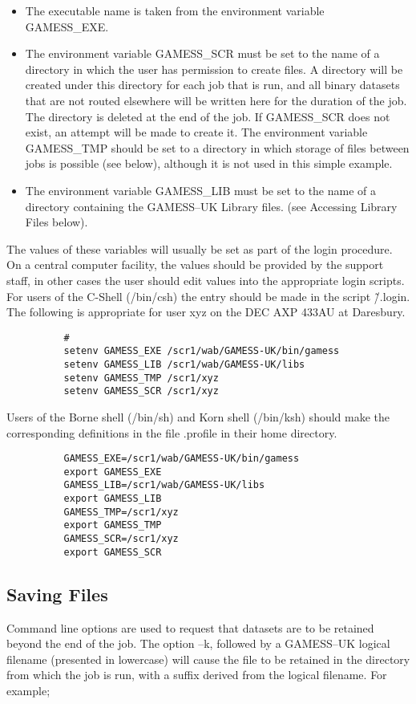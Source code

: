 \documentclass[11pt,fleqn]{article}
\begin{document}
\begin{itemize}
\item The executable name is taken from the environment variable GAMESS\_EXE.

\item The environment variable GAMESS\_SCR must be set to the name of a directory
in which the user has permission to create files. A directory will be created under
this directory for each job that is run, and all binary datasets that are not routed elsewhere
will be written here for the duration of the job. The directory is deleted at the end of 
the job. If GAMESS\_SCR does not exist, an attempt will be made to create it. The 
environment variable GAMESS\_TMP should be set 
to a directory in which storage of files between jobs is possible (see below),
although it is not used in this simple example.
\item The environment variable GAMESS\_LIB must be set to the name of a directory containing
the GAMESS--UK Library files. (see Accessing Library Files below).
\end{itemize}
The values of these variables will usually be set as part of the
login procedure. On a central computer facility, the values should be provided
by the support staff, in other cases the user should edit values into the appropriate
login scripts. For users of the C-Shell (/bin/csh) the entry should be made in the
script \~/.login. The following is appropriate for user xyz on the DEC AXP 433AU at Daresbury.

{
\footnotesize
\begin{verbatim}
          #
          setenv GAMESS_EXE /scr1/wab/GAMESS-UK/bin/gamess
          setenv GAMESS_LIB /scr1/wab/GAMESS-UK/libs
          setenv GAMESS_TMP /scr1/xyz
          setenv GAMESS_SCR /scr1/xyz
\end{verbatim}
}
Users of the Borne shell (/bin/sh) and Korn shell (/bin/ksh)
should make the corresponding definitions in the file .profile in their home directory.

{
\footnotesize
\begin{verbatim}
          GAMESS_EXE=/scr1/wab/GAMESS-UK/bin/gamess
          export GAMESS_EXE
          GAMESS_LIB=/scr1/wab/GAMESS-UK/libs
          export GAMESS_LIB
          GAMESS_TMP=/scr1/xyz
          export GAMESS_TMP
          GAMESS_SCR=/scr1/xyz
          export GAMESS_SCR
          \end{verbatim}
}

\subsection[Saving Files]{Saving Files}
Command line options are used to request that datasets are to be retained beyond the 
end of the job.
The option --k, followed by a GAMESS--UK
logical filename (presented in lowercase) will cause the file to be retained in the 
directory from which the job is run, with a suffix derived from the logical filename. For example;
\end{document}

